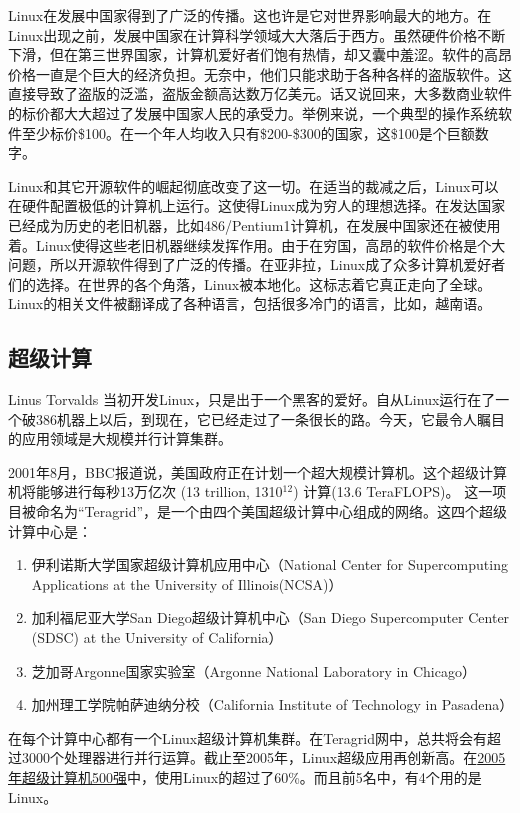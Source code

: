 \documentclass[12pt,a4paper]{article}
\begin{document}
   Linux在发展中国家得到了广泛的传播。这也许是它对世界影响最大的地方。在Linux出现之前，发展中国家在计算科学领域大大落后于西方。虽然硬件价格不断下滑，但在第三世界国家，计算机爱好者们饱有热情，却又囊中羞涩。软件的高昂价格一直是个巨大的经济负担。无奈中，他们只能求助于各种各样的盗版软件。这直接导致了盗版的泛滥，盗版金额高达数万亿美元。话又说回来，大多数商业软件的标价都大大超过了发展中国家人民的承受力。举例来说，一个典型的操作系统软件至少标价\$100。在一个年人均收入只有\$200-\$300的国家，这\$100是个巨额数字。

   Linux和其它开源软件的崛起彻底改变了这一切。在适当的裁减之后，Linux可以在硬件配置极低的计算机上运行。这使得Linux成为穷人的理想选择。在发达国家已经成为历史的老旧机器，比如486/Pentium1计算机，在发展中国家还在被使用着。Linux使得这些老旧机器继续发挥作用。由于在穷国，高昂的软件价格是个大问题，所以开源软件得到了广泛的传播。在亚非拉，Linux成了众多计算机爱好者们的选择。在世界的各个角落，Linux被本地化。这标志着它真正走向了全球。Linux的相关文件被翻译成了各种语言，包括很多冷门的语言，比如，越南语。
\subsection{超级计算}
\label{sec-4-3}

   Linus Torvalds 当初开发Linux，只是出于一个黑客的爱好。自从Linux运行在了一个破386机器上以后，到现在，它已经走过了一条很长的路。今天，它最令人瞩目的应用领域是大规模并行计算集群。

   2001年8月，BBC报道说，美国政府正在计划一个超大规模计算机。这个超级计算机将能够进行每秒13万亿次 (13 trillion, 13\texttimes{}10$^{\mathrm{12}}$) 计算(13.6 TeraFLOPS)。 这一项目被命名为“Teragrid”，是一个由四个美国超级计算中心组成的网络。这四个超级计算中心是：
\begin{enumerate}
\item 伊利诺斯大学国家超级计算机应用中心（National Center for Supercomputing Applications at the University of Illinois(NCSA)）
\item 加利福尼亚大学San Diego超级计算机中心（San Diego Supercomputer Center (SDSC) at the University of California）
\item 芝加哥Argonne国家实验室（Argonne National Laboratory in Chicago）
\item 加州理工学院帕萨迪纳分校（California Institute of Technology in Pasadena）
\end{enumerate}

  在每个计算中心都有一个Linux超级计算机集群。在Teragrid网中，总共将会有超过3000个处理器进行并行运算。截止至2005年，Linux超级应用再创新高。在\href{http://www.top500.org/}{2005年超级计算机500强}中，使用Linux的超过了60\%。而且前5名中，有4个用的是Linux。
\end{document}

